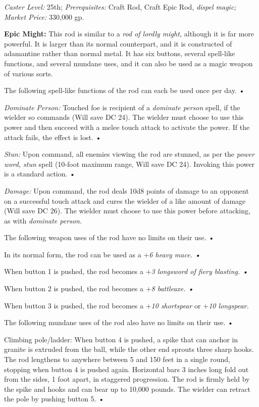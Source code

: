 \documentclass{article}
\begin{document}
\textit{Caster Level: }25th; \textit{Prerequisites: }Craft Rod, Craft Epic Rod, 
\textit{dispel magic; Market Price: }330,000 gp. 

\textbf{Epic Might: }This rod is similar to a \textit{rod of lordly might, }although 
it is far more powerful. It is larger than its normal counterpart, and it is constructed 
of adamantine rather than normal metal. It has six buttons, several spell-like 
functions, and several mundane uses, and it can also be used as a magic weapon 
of various sorts. 

The following spell-like functions of the rod can each be used once per day. • 

\textit{Dominate Person: }Touched foe is recipient of a \textit{dominate person 
}spell, if the wielder so commands (Will save DC 24). The wielder must choose to 
use this power and then succeed with a melee touch attack to activate the power. 
If the attack fails, the effect is lost. • 

\textit{Stun: }Upon command, all enemies viewing the rod are stunned, as per the 
\textit{power word, stun }spell (10-foot maximum range, Will save DC 24). Invoking 
this power is a standard action. • 

\textit{Damage: }Upon command, the rod deals 10d8 points of damage to an opponent 
on a successful touch attack and cures the wielder of a like amount of damage (Will 
save DC 26). The wielder must choose to use this power before attacking, as with 
\textit{dominate person.}

The following weapon uses of the rod have no limits on their use. • 

\parindent=3pt
In its normal form, the rod can be used as a  +\textit{6 heavy mace. • }

When button 1 is pushed, the rod becomes a +\textit{3 longsword of fiery blasting. 
• }

When button 2 is pushed, the rod becomes a +\textit{8 battleaxe. • }

When button 3 is pushed, the rod becomes a +\textit{10 shortspear }or +\textit{10 
longspear.}

\parindent=0pt
The following mundane uses of the rod also have no limits on their use. • 

\parindent=3pt
Climbing pole/ladder: When button 4 is pushed, a spike that can anchor in granite 
is extruded from the ball, while the other end sprouts three sharp hooks. The rod 
lengthens to anywhere between 5 and 150 feet in a single round, stopping when button 
4 is pushed again. Horizontal bars 3 inches long fold out from the sides, 1 foot 
apart, in staggered progression. The rod is firmly held by the spike and hooks 
and can bear up to 10,000 pounds. The wielder can retract the pole by pushing button 
5. • 
\end{document}
